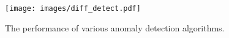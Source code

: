 \begin{figure}[!htb]
    \centering
    \texttt{[image: images/diff\_detect.pdf]}
    \caption{\label{fig:diff_detect}
    The performance of various anomaly detection algorithms.
    }
\end{figure}
